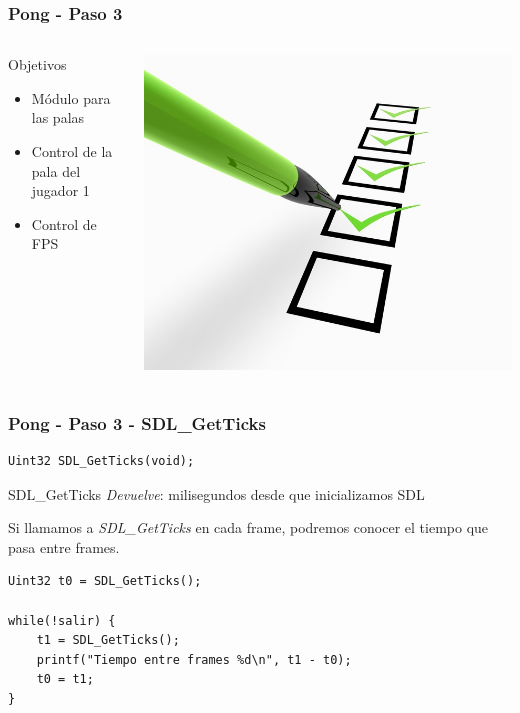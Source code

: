 \begin{frame}
	\frametitle{Pong - Paso 3}
    \begin{columns}[c]
	\column{175pt}
	\begin{block}{Objetivos}
		\begin{itemize}
			\item Módulo para las palas
			\item Control de la pala del jugador 1
			\item Control de FPS
		\end{itemize}            
	\end{block}

    \column{125pt}
	\begin{center}
		\includegraphics[scale=0.6]{img/checklist.jpg}
	\end{center}	
	
    \end{columns}
\end{frame}

\begin{frame}[fragile]
    \frametitle{Pong - Paso 3 - SDL\_GetTicks}
	
\begin{verbatim}
Uint32 SDL_GetTicks(void);
\end{verbatim}

    \begin{block}{SDL\_GetTicks}
	\emph{Devuelve}: milisegundos desde que inicializamos SDL
    \end{block}
    
    Si llamamos a \emph{SDL\_GetTicks} en cada frame, podremos conocer
    el tiempo que pasa entre frames.
    
\begin{verbatim}
Uint32 t0 = SDL_GetTicks();

while(!salir) {
    t1 = SDL_GetTicks();
    printf("Tiempo entre frames %d\n", t1 - t0);
    t0 = t1;
}
\end{verbatim}

\end{frame}

